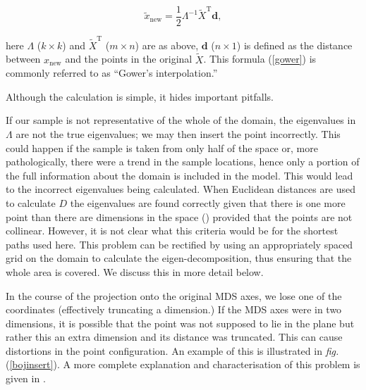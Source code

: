 \documentclass[a4paper,10pt]{amsart}
\newcommand{\fig}[1]{\emph{fig.} (\ref{#1})}
\newcommand{\tr}[1]{#1^{\text{T}}}
\newcommand{\cross}{\times}
\begin{document}
\begin{equation}
\tilde{x}_{\text{new}} = \frac{1}{2} \Lambda^{-1} \tr{\tilde{X}} \mathbf{d},
\label{gower}
\end{equation}

here $\Lambda$ ($k \cross k$) and $\tr{\tilde{X}}$ ($m \cross n$) are as above, $\mathbf{d}$ ($n \cross 1$) is defined as the distance between $x_{\text{new}}$ and the points in the original $\tilde{X}$. This formula (\ref{gower}) is commonly referred to as ``Gower's interpolation.''

Although the calculation is simple, it hides important pitfalls. 

If our sample is not representative of the whole of the domain, the eigenvalues in $\Lambda$ are not the true eigenvalues; we may then insert the point incorrectly. This could happen if the sample is taken from only half of the space or, more pathologically, there were a trend in the sample locations, hence only a portion of the full information about the domain is included in the model. This would lead to the incorrect eigenvalues being calculated. When Euclidean distances are used to calculate $D$ the eigenvalues are found correctly given that there is one more point than there are dimensions in the space (\cite{landmark}) provided that the points are not collinear. However, it is not clear what this criteria would be for the shortest paths used here. This problem can be rectified by using an appropriately spaced grid on the domain to calculate the eigen-decomposition, thus ensuring that the whole area is covered. We discuss this in more detail below.

In the course of the projection onto the original MDS axes, we lose one of the coordinates (effectively truncating a dimension.) If the MDS axes were in two dimensions, it is possible that the point was not supposed to lie in the plane but rather this an extra dimension and its distance was truncated. This can cause distortions in the point configuration. An example of this is illustrated in \fig{bojinsert}. A more complete explanation and characterisation of this problem is given in \cite{Boj2009}. 
\end{document}
